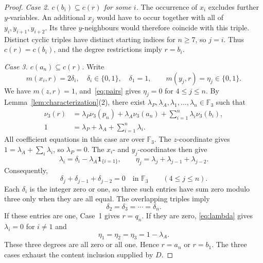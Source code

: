 \documentclass[11pt,reqno]{amsart}
\theoremstyle{remark}
\newcommand{\F}{\mathbb F}
\numberwithin{equation}{section}
\begin{document}
\begin{proof}
\emph{Case 2. $c(b_i)\subseteq c(r)$ for some $i$.} The occurrence of
$x_i$ excludes further $y$-variables. An additional $x_j$ would have to
occur together with all of $y_i,y_{i+1},y_{i+2}$. Its three $y$-neighbours
would therefore coincide with this triple. Distinct cyclic triples have
distinct starting indices for $n\geq7$, so $j=i$. Thus $c(r)=c(b_i)$,
and the degree restrictions imply $r=b_i$.

\emph{Case 3. $c(a_n)\subseteq c(r)$.} Write
\[
m(x_i,r)=2\delta_i,\quad \delta_i\in\{0,1\},\quad\delta_1=1,
\qquad m(y_j,r)=\eta_j\in\{0,1\}.
\]
We have $m(z,r)=1$, and~\eqref{eq:pairs} gives $\eta_j=0$ for
$4\leq j\leq n$. By Lemma~\ref{lem:characterization}(2), there exist
$\lambda_P,\lambda_A,\lambda_1,\ldots,\lambda_n\in\F_3$ such that
\begin{align*}
\nu_3(r)&=\lambda_P\nu_3(p_n)+\lambda_A\nu_3(a_n)
              +\sum_{i=1}^n\lambda_i\nu_3(b_i),\\
1&=\lambda_P+\lambda_A+\sum_{i=1}^n\lambda_i.
\end{align*}
All coefficient equations in this case are over $\F_3$. The
$z$-coordinate gives $1=\lambda_A+\sum_i\lambda_i$, so
$\lambda_P=0$. The $x_i$- and $y_j$-coordinates then give
\begin{equation}\label{eq:lambda}
\lambda_i=\delta_i-\lambda_A\mathbf1_{\{i=1\}},\qquad
\eta_j=\lambda_j+\lambda_{j-1}+\lambda_{j-2}.
\end{equation}
Consequently,
\[
\delta_j+\delta_{j-1}+\delta_{j-2}=0\quad\text{in }\F_3
\qquad(4\leq j\leq n).
\]
Each $\delta_i$ is the integer zero or one, so three such entries have
sum zero modulo three only when they are all equal. The overlapping
triples imply
\[
\delta_2=\delta_3=\cdots=\delta_n.
\]
If these entries are one, Case~1 gives $r=q_n$. If they are zero,
\eqref{eq:lambda} gives $\lambda_i=0$ for $i\ne1$ and
\[
\eta_1=\eta_2=\eta_3=1-\lambda_A.
\]
These three degrees are all zero or all one. Hence $r=a_n$ or $r=b_1$.
The three cases exhaust the content inclusion supplied by $D$.
\end{proof}
\end{document}
